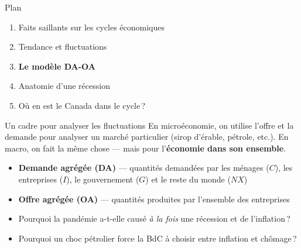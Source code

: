\documentclass[aspectratio=169]{beamer}
\begin{document}
\begin{frame}{Plan}
   \begin{enumerate}
      \setlength\itemsep{0.5cm}
      \item {\color{gray!50}Faits saillants sur les cycles économiques}
      \item {\color{gray!50}Tendance et fluctuations}
      \item \textbf{Le modèle DA-OA}
      \item Anatomie d'une récession
      \item Où en est le Canada dans le cycle\,?
   \end{enumerate}
\end{frame}


\begin{frame}[t]{Un cadre pour analyser les fluctuations}\examtag
   \small
   En microéconomie, on utilise l'offre et la demande pour analyser un marché particulier (sirop d'érable, pétrole, etc.). En macro, on fait la même chose --- mais pour l'\textbf{économie dans son ensemble}.

   \vspace{0.2cm}
   \begin{itemize}
      \setlength\itemsep{0.2cm}
      \item \textbf{Demande agrégée (DA)} --- quantités demandées par les ménages ($C$), les entreprises ($I$), le gouvernement ($G$) et le reste du monde ($NX$)
      \item \textbf{Offre agrégée (OA)} --- quantités produites par l'ensemble des entreprises
   \end{itemize}

   \vspace{0.2cm}
   \begin{bizimplication}
      \footnotesize
      \vspace{-0.5cm}
      \begin{itemize}
         \setlength\itemsep{0.05cm}
         \item Pourquoi la pandémie a-t-elle causé \textit{à la fois} une récession et de l'inflation\,?
         \item Pourquoi un choc pétrolier force la BdC à choisir entre inflation et chômage\,?
      \end{itemize}
   \end{bizimplication}
\end{frame}
\end{document}
